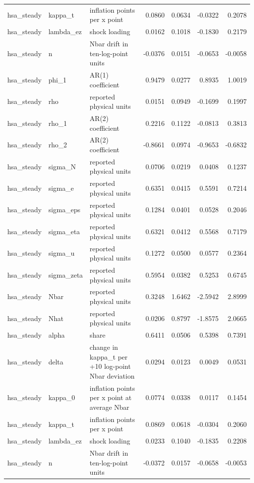 \begin{tabular}{lllrrrr}
hsa\_steady & kappa\_t & inflation points per x point & 0.0860 & 0.0634 & -0.0322 & 0.2078 \\
hsa\_steady & lambda\_ez & shock loading & 0.0162 & 0.1018 & -0.1830 & 0.2179 \\
hsa\_steady & n & Nbar drift in ten-log-point units & -0.0376 & 0.0151 & -0.0653 & -0.0058 \\
hsa\_steady & phi\_1 & AR(1) coefficient & 0.9479 & 0.0277 & 0.8935 & 1.0019 \\
hsa\_steady & rho & reported physical units & 0.0151 & 0.0949 & -0.1699 & 0.1997 \\
hsa\_steady & rho\_1 & AR(2) coefficient & 0.2216 & 0.1122 & -0.0813 & 0.3813 \\
hsa\_steady & rho\_2 & AR(2) coefficient & -0.8661 & 0.0974 & -0.9653 & -0.6832 \\
hsa\_steady & sigma\_N & reported physical units & 0.0706 & 0.0219 & 0.0408 & 0.1237 \\
hsa\_steady & sigma\_e & reported physical units & 0.6351 & 0.0415 & 0.5591 & 0.7214 \\
hsa\_steady & sigma\_eps & reported physical units & 0.1284 & 0.0401 & 0.0528 & 0.2046 \\
hsa\_steady & sigma\_eta & reported physical units & 0.6321 & 0.0412 & 0.5568 & 0.7179 \\
hsa\_steady & sigma\_u & reported physical units & 0.1272 & 0.0500 & 0.0577 & 0.2364 \\
hsa\_steady & sigma\_zeta & reported physical units & 0.5954 & 0.0382 & 0.5253 & 0.6745 \\
hsa\_steady & Nbar & reported physical units & 0.3248 & 1.6462 & -2.5942 & 2.8999 \\
hsa\_steady & Nhat & reported physical units & 0.0206 & 0.8797 & -1.8575 & 2.0665 \\
hsa\_steady & alpha & share & 0.6411 & 0.0506 & 0.5398 & 0.7391 \\
hsa\_steady & delta & change in kappa\_t per +10 log-point Nbar deviation & 0.0294 & 0.0123 & 0.0049 & 0.0531 \\
hsa\_steady & kappa\_0 & inflation points per x point at average Nbar & 0.0774 & 0.0338 & 0.0117 & 0.1454 \\
hsa\_steady & kappa\_t & inflation points per x point & 0.0869 & 0.0618 & -0.0304 & 0.2060 \\
hsa\_steady & lambda\_ez & shock loading & 0.0233 & 0.1040 & -0.1835 & 0.2208 \\
hsa\_steady & n & Nbar drift in ten-log-point units & -0.0372 & 0.0157 & -0.0658 & -0.0053 \\

\end{tabular}

